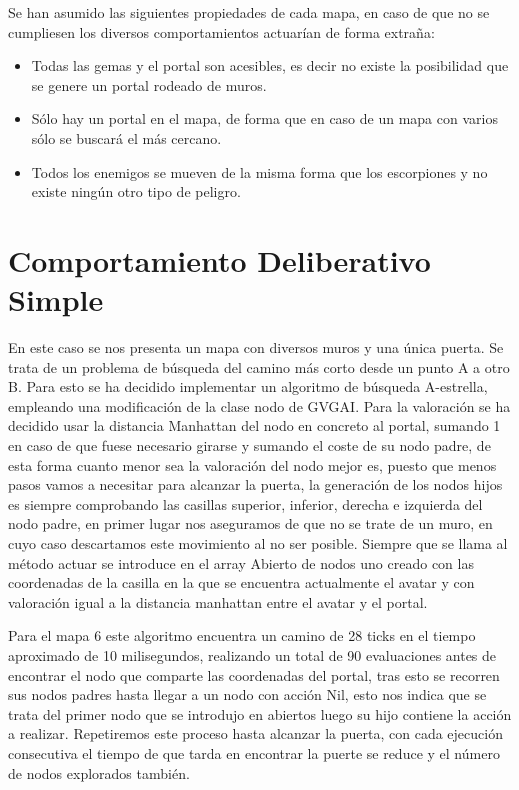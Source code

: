 Se han asumido las siguientes propiedades de cada mapa, en caso de que no se cumpliesen los diversos comportamientos actuarían de forma extraña:
\begin{itemize}
	\item Todas las gemas y el portal son acesibles, es decir no existe la posibilidad que se genere un portal rodeado de muros.
	\item Sólo hay un portal en el mapa, de forma que en caso de un mapa con varios sólo se buscará el más cercano.
	\item Todos los enemigos se mueven de la misma forma que los escorpiones y no existe ningún otro tipo de peligro.
\end{itemize}

\section{Comportamiento Deliberativo Simple}
En este caso se nos presenta un mapa con diversos muros y una única puerta. Se trata de un problema de búsqueda  del camino más corto desde un punto A a otro B. Para esto se ha decidido implementar un algoritmo de búsqueda A-estrella, empleando una modificación de la clase nodo de GVGAI. Para la valoración se ha decidido usar la distancia Manhattan del nodo en concreto al portal, sumando 1 en caso de que fuese necesario girarse y sumando el coste de su nodo padre, de esta forma cuanto menor sea la valoración del nodo mejor es, puesto que menos pasos vamos a necesitar para alcanzar la puerta, la generación de los nodos hijos es siempre comprobando las casillas superior, inferior, derecha e izquierda del nodo padre, en primer lugar nos aseguramos de que no se trate de un muro, en cuyo caso descartamos este movimiento al no ser posible. Siempre que se llama al método actuar se introduce en el array Abierto de nodos uno creado con las coordenadas de la casilla en la que se encuentra actualmente el avatar y con valoración igual a la distancia manhattan entre el avatar y el portal.

Para el mapa 6 este algoritmo encuentra un camino de 28 ticks en el tiempo aproximado de 10 milisegundos, realizando un total de 90 evaluaciones antes de encontrar el nodo que comparte las coordenadas del portal, tras esto se recorren sus nodos padres hasta llegar a un nodo con acción Nil, esto nos indica que se trata del primer nodo que se introdujo en abiertos luego su hijo contiene la acción a realizar. Repetiremos este proceso hasta alcanzar la puerta, con cada ejecución consecutiva el tiempo de que tarda en encontrar la puerte se reduce y el número de nodos explorados también.


